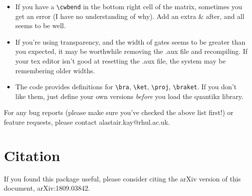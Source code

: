 \documentclass[aps,pra,10pt,nofootinbib]{revtex4}
\begin{document}
\begin{itemize}
\begin{Code}
\begin{lstlisting}
\begin{quantikz}[ampersand replacement=\&]
\lstick{$\ket{0}$} \& \gate{\left(\begin{array}{cc} \alpha & \beta \\ \beta & -\alpha \end{array}\right)} \& \ctrl{1} \& \gate{U_1} \& \qw \\
\lstick{$\ket{0}$} \& \qw \& \targ{} \& \gate{U_2} \& \qw
\end{quantikz}
\end{lstlisting}
\end{Code}
Beamer is particularly annoying with doing this. It probably helps to issue a global command
\begin{lstlisting}
\tikzcdset{
	every matrix/.style={ampersand replacement=\&}
}
\end{lstlisting}
Beamer is particularly annoying with doing this. It probably helps to issue a global command
\begin{lstlisting}
\tikzcdset{
	every matrix/.style={ampersand replacement=\&}
}
\end{lstlisting}
somewhere in your document preamble. The tikzcd manual suggests another possible strategy, but I haven't had much success with it.
\item If you have a \verb!\cwbend! in the bottom right cell of the matrix, sometimes you get an error (I have no understanding of why). Add an extra \& after, and all seems to be well.
\item If you're using transparency, and the width of gates seems to be greater than you expected, it may be worthwhile removing the .aux file and recompiling. If your tex editor isn't good at resetting the .aux file, the system may be remembering older widths.
\item The code provides definitions for \verb!\bra!, \verb!\ket!, \verb!\proj!, \verb!\braket!. If you don't like them, just define your own versions \emph{before} you load the quantikz library.
\end{itemize}

For any bug reports (please make sure you've checked the above list first!) or feature requests, please contact alastair.kay@rhul.ac.uk.

\section{Citation}

If you found this package useful, please consider citing the arXiv version of this document, arXiv:1809.03842.
\end{document}
